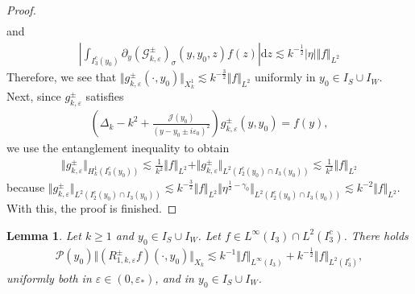 \documentclass[11pt,reqno]{amsproc}
\newtheorem{lemma}[proposition]{Lemma}
\theoremstyle{definition}
\numberwithin{equation}{section}
\newcommand{\G}{{\mathcal{G}}}
\newcommand{\cJ}{{\mathcal{J}}}
\newcommand{\D}{{\Delta}}
\renewcommand{\d}{\mathrm{d}}
\newcommand{\ep}{\varepsilon}
\renewcommand{\P}{{\mathcal{P}}}
\begin{document}
\begin{proof}
\begin{align*}
\end{align*}
 and
 \begin{align*}
\left| \int_{I_3^c(y_0)} \partial_y\left( \G_{k,\ep}^\pm\right)_{\sigma}(y,y_0,z) f(z) \right| \d z \lesssim k^{-\frac12}|\eta|\Vert f \Vert_{L^2}
\end{align*}
Therefore, we see that $\Vert g_{k,\ep}^\pm(\cdot,y_0) \Vert_{X_k^1}\lesssim k^{-\frac32}\Vert f \Vert_{L^2}$ uniformly in $y_0\in I_S \cup I_W$. Next, since $g_{k,\ep}^\pm$ satisfies
\begin{align*}
\left( \D_k - k^2 + \frac{\cJ(y_0)}{(y-y_0\pm i\ep_0)^2} \right) g_{k,\ep}^\pm(y,y_0) = f(y),
\end{align*}
we use the entanglement inequality to obtain
\begin{align*}
\Vert g_{k,\ep}^\pm \Vert_{H^1_k(I_3^c(y_0))} \lesssim \frac{1}{k^2}\Vert f \Vert_{L^2} + \Vert g_{k,\ep}^\pm \Vert_{L^2(I_2^c(y_0)\cap I_3(y_0))} \lesssim \frac{1}{k^2}\Vert f \Vert_{L^2}
\end{align*}
because $\Vert g_{k,\ep}^\pm \Vert_{L^2(I_2^c(y_0)\cap I_3(y_0))} \lesssim k^{-\frac32}\Vert f \Vert_{L^2} \Vert \eta^{\frac12-\gamma_0}\Vert_{L^2(I_2^c(y_0)\cap I_3(y_0))} \lesssim k^{-2}\Vert f \Vert_{L^2}$. With this, the proof is finished.
\end{proof}


\begin{lemma}\label{lemma:R1mapsPLinfL2toXk}
Let $k\geq 1$ and $y_0\in I_S\cup I_{W}$. Let $f\in L^\infty (I_3)\cap L^2(I_3^c)$. There holds
\begin{align*}
\P(y_0)\Vert (R_{1,k,\ep}^\pm f)(\cdot,y_0) \Vert_{X_k} \lesssim k^{-1} \Vert f \Vert_{L^\infty(I_3)} +  k^{-\frac12} \Vert f \Vert_{L^2(I_3^c)},
\end{align*}
uniformly both in $\ep\in (0, \ep_*)$, and in $y_0\in I_S\cup I_{W}$.
\end{lemma}
\end{document}
